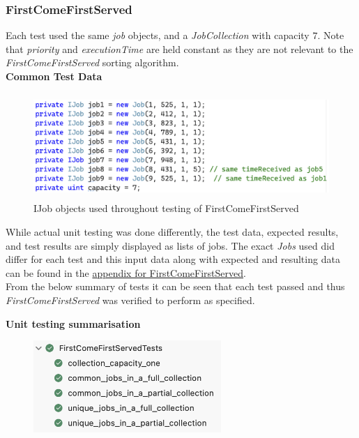 \documentclass[a4paper]{article}
\begin{document}
\subsubsection{FirstComeFirstServed}
Each test used the same \textit{job} objects, and a \textit{JobCollection} with capacity $7$. Note that \textit{priority} and \textit{executionTime} are held constant as they are not relevant to the \textit{FirstComeFirstServed} sorting algorithm.
\\[6pt]
\textbf{Common Test Data}
\begin{figure}[H]
   \centering
   \includegraphics[height=4cm]{images/FCFS-data.png}
   \caption{IJob objects used throughout testing of FirstComeFirstServed}
\end{figure}
While actual unit testing was done differently, the test data, expected results, and test results are simply displayed as lists of jobs. The exact \textit{Jobs} used did differ for each test and this input data along with expected and resulting data can be found in the \hyperlink{subsubsection.5.3.1}{appendix for FirstComeFirstServed}.
\\[3pt]
From the below summary of tests it can be seen that each test passed and thus \textit{FirstComeFirstServed} was verified to perform as specified.
\pagebreak

\textbf{Unit testing summarisation}
\begin{figure}[H]
   \includegraphics[height=3.5cm]{images/FCFS-summary.png}
\end{figure}
\end{document}

